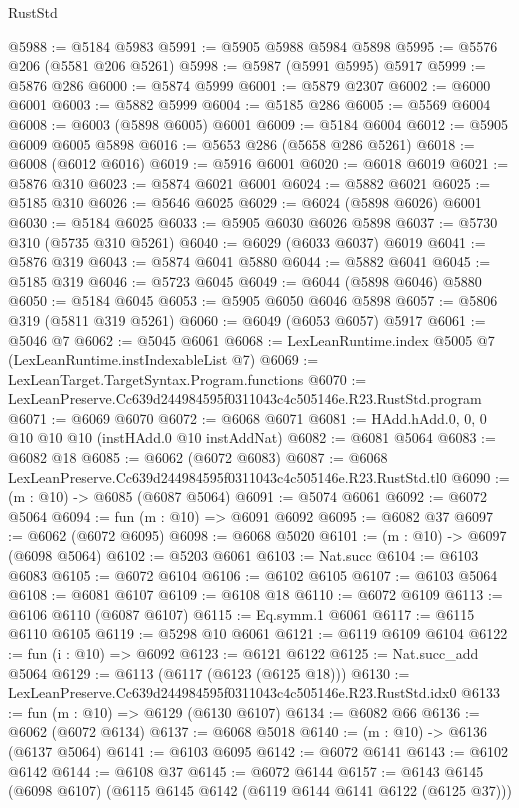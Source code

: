 \begin{lexlean}{RustStd}
\begin{coremodule}
@5988 := @5184 @5983
@5991 := @5905 @5988 @5984 @5898
@5995 := @5576 @206 (@5581 @206 @5261)
@5998 := @5987 (@5991 @5995) @5917
@5999 := @5876 @286
@6000 := @5874 @5999
@6001 := @5879 @2307
@6002 := @6000 @6001
@6003 := @5882 @5999
@6004 := @5185 @286
@6005 := @5569 @6004
@6008 := @6003 (@5898 @6005) @6001
@6009 := @5184 @6004
@6012 := @5905 @6009 @6005 @5898
@6016 := @5653 @286 (@5658 @286 @5261)
@6018 := @6008 (@6012 @6016)
@6019 := @5916 @6001
@6020 := @6018 @6019
@6021 := @5876 @310
@6023 := @5874 @6021 @6001
@6024 := @5882 @6021
@6025 := @5185 @310
@6026 := @5646 @6025
@6029 := @6024 (@5898 @6026) @6001
@6030 := @5184 @6025
@6033 := @5905 @6030 @6026 @5898
@6037 := @5730 @310 (@5735 @310 @5261)
@6040 := @6029 (@6033 @6037) @6019
@6041 := @5876 @319
@6043 := @5874 @6041 @5880
@6044 := @5882 @6041
@6045 := @5185 @319
@6046 := @5723 @6045
@6049 := @6044 (@5898 @6046) @5880
@6050 := @5184 @6045
@6053 := @5905 @6050 @6046 @5898
@6057 := @5806 @319 (@5811 @319 @5261)
@6060 := @6049 (@6053 @6057) @5917
@6061 := @5046 @7
@6062 := @5045 @6061
@6068 := LexLeanRuntime.index @5005 @7 (LexLeanRuntime.instIndexableList @7)
@6069 := LexLeanTarget.TargetSyntax.Program.functions
@6070 := LexLeanPreserve.Cc639d244984595f0311043c4c505146e.R23.RustStd.program
@6071 := @6069 @6070
@6072 := @6068 @6071
@6081 := HAdd.hAdd.{0, 0, 0} @10 @10 @10 (instHAdd.{0} @10 instAddNat)
@6082 := @6081 @5064
@6083 := @6082 @18
@6085 := @6062 (@6072 @6083)
@6087 := @6068 LexLeanPreserve.Cc639d244984595f0311043c4c505146e.R23.RustStd.tl0
@6090 := (m : @10) -> @6085 (@6087 @5064)
@6091 := @5074 @6061
@6092 := @6072 @5064
@6094 := fun (m : @10) => @6091 @6092
@6095 := @6082 @37
@6097 := @6062 (@6072 @6095)
@6098 := @6068 @5020
@6101 := (m : @10) -> @6097 (@6098 @5064)
@6102 := @5203 @6061
@6103 := Nat.succ
@6104 := @6103 @6083
@6105 := @6072 @6104
@6106 := @6102 @6105
@6107 := @6103 @5064
@6108 := @6081 @6107
@6109 := @6108 @18
@6110 := @6072 @6109
@6113 := @6106 @6110 (@6087 @6107)
@6115 := Eq.symm.{1} @6061
@6117 := @6115 @6110 @6105
@6119 := @5298 @10 @6061
@6121 := @6119 @6109 @6104
@6122 := fun (i : @10) => @6092
@6123 := @6121 @6122
@6125 := Nat.succ_add @5064
@6129 := @6113 (@6117 (@6123 (@6125 @18)))
@6130 := LexLeanPreserve.Cc639d244984595f0311043c4c505146e.R23.RustStd.idx0
@6133 := fun (m : @10) => @6129 (@6130 @6107)
@6134 := @6082 @66
@6136 := @6062 (@6072 @6134)
@6137 := @6068 @5018
@6140 := (m : @10) -> @6136 (@6137 @5064)
@6141 := @6103 @6095
@6142 := @6072 @6141
@6143 := @6102 @6142
@6144 := @6108 @37
@6145 := @6072 @6144
@6157 := @6143 @6145 (@6098 @6107) (@6115 @6145 @6142 (@6119 @6144 @6141 @6122 (@6125 @37)))

\end{coremodule}
\end{lexlean}
